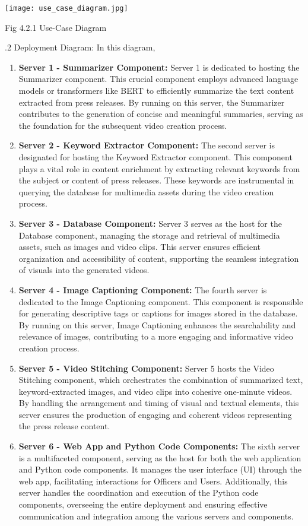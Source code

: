 \documentclass[12pt]{article}
\begin{document}
\noindent \justify \texttt{[image: use\_case\_diagram.jpg]}
\begin{center}
    Fig 4.2.1 Use-Case Diagram
\end{center}

\bigskip


.2 Deployment Diagram:
\justify In this diagram,
\begin{enumerate}
    \item \textbf{Server 1 - Summarizer Component:} Server 1 is dedicated to hosting the Summarizer component. This crucial component employs advanced language models or transformers like BERT to efficiently summarize the text content extracted from press releases. By running on this server, the Summarizer contributes to the generation of concise and meaningful summaries, serving as the foundation for the subsequent video creation process.
    \item \textbf{Server 2 - Keyword Extractor Component:}  The second server is designated for hosting the Keyword Extractor component. This component plays a vital role in content enrichment by extracting relevant keywords from the subject or content of press releases. These keywords are instrumental in querying the database for multimedia assets during the video creation process.
    \item \textbf{Server 3 - Database Component:} Server 3 serves as the host for the Database component, managing the storage and retrieval of multimedia assets, such as images and video clips. This server ensures efficient organization and accessibility of content, supporting the seamless integration of visuals into the generated videos.
    \item \textbf{Server 4 - Image Captioning Component:} The fourth server is dedicated to the Image Captioning component. This component is responsible for generating descriptive tags or captions for images stored in the database. By running on this server, Image Captioning enhances the searchability and relevance of images, contributing to a more engaging and informative video creation process.
    \item \textbf{Server 5 - Video Stitching Component:} Server 5 hosts the Video Stitching component, which orchestrates the combination of summarized text, keyword-extracted images, and video clips into cohesive one-minute videos. By handling the arrangement and timing of visual and textual elements, this server ensures the production of engaging and coherent videos representing the press release content.
    \item \textbf{Server 6 - Web App and Python Code Components:} The sixth server is a multifaceted component, serving as the host for both the web application and Python code components. It manages the user interface (UI) through the web app, facilitating interactions for Officers and Users. Additionally, this server handles the coordination and execution of the Python code components, overseeing the entire deployment and ensuring effective communication and integration among the various servers and components.
\end{enumerate}
\end{document}
